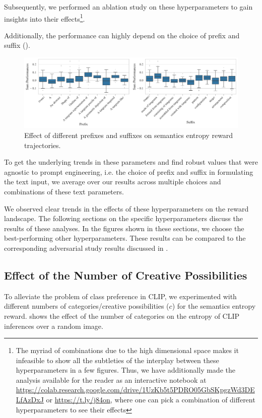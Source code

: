 Subsequently, we performed an ablation study on these hyperparameters to gain insights into their effects\footnote{The myriad of combinations due to the high dimensional space makes it infeasible to show all the subtleties of the interplay between these hyperparameters in a few figures.
Thus, we have additionally made the analysis available for the reader as an interactive notebook at \url{https://colab.research.google.com/drive/1UzKb5t5PDRO05GbSKpgzWd3DELfAzDxJ} or \url{https://t.ly/j84on}, where one can pick a combination of different hyperparameters to see their effects}.

Additionally, the performance can highly depend on the choice of prefix and suffix ().

\begin{figure}
    \centering
    \includegraphics[width=\textwidth]{images/prefix-suffix.pdf}
    \caption{Effect of different prefixes and suffixes on semantics entropy reward trajectories.}
    \label{fig:prefix-suffix}
\end{figure}

To get the underlying trends in these parameters and find robust values that were agnostic to prompt engineering, i.e. the choice of prefix and suffix in formulating the text input, we average over our results across multiple choices and combinations of these text parameters.

We observed clear trends in the effects of these hyperparameters on the reward landscape.
The following sections on the specific hyperparameters discuss the results of these analyses.
In the figures shown in these sections, we choose the best-performing other hyperparameters.
These results can be compared to the corresponding adversarial study results discussed in .

\subsection{Effect of the Number of Creative Possibilities}
\label{sec:clip-categories}
To alleviate the problem of class preference in CLIP, we experimented with different numbers of categories/creative possibilities (\(c\)) for the semantics entropy reward.
 shows the effect of the number of categories on the entropy of CLIP inferences over a random image.

